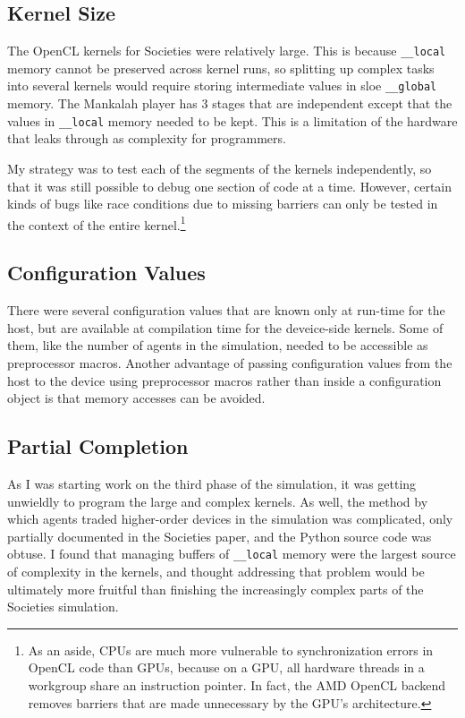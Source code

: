 \documentclass{article}
\begin{document}
\subsection{Kernel Size}
The OpenCL kernels for Societies were relatively large. This is because \texttt{\_\_local} memory cannot be preserved across kernel runs, so splitting up complex tasks into several kernels would require storing intermediate values in sloe \texttt{\_\_global} memory. The Mankalah player has 3 stages that are independent except that the values in \texttt{\_\_local} memory needed to be kept. This is a limitation of the hardware that leaks through as complexity for programmers.

My strategy was to test each of the segments of the kernels independently, so that it was still possible to debug one section of code at a time. However, certain kinds of bugs like race conditions due to missing barriers can only be tested in the context of the entire kernel.\footnote{As an aside, CPUs are much more vulnerable to synchronization errors in OpenCL code than GPUs, because on a GPU, all hardware threads in a workgroup share an instruction pointer. In fact, the AMD OpenCL backend removes barriers that are made unnecessary by the GPU's architecture.}

\subsection{Configuration Values}
There were several configuration values that are known only at run-time for the host, but are available at compilation time for the deveice-side kernels. Some of them, like the number of agents in the simulation, needed to be accessible as preprocessor macros. Another advantage of passing configuration values from the host to the device using preprocessor macros rather than inside a configuration object is that memory accesses can be avoided.

\subsection{Partial Completion}
As I was starting work on the third phase of the simulation, it was getting unwieldly to program the large and complex kernels. As well, the method by which agents traded higher-order devices in the simulation was complicated, only partially documented in the Societies paper, and the Python source code was obtuse. I found that managing buffers of \texttt{\_\_local} memory were the largest source of complexity in the kernels, and thought addressing that problem would be ultimately more fruitful than finishing the increasingly complex parts of the Societies simulation.
\end{document}
